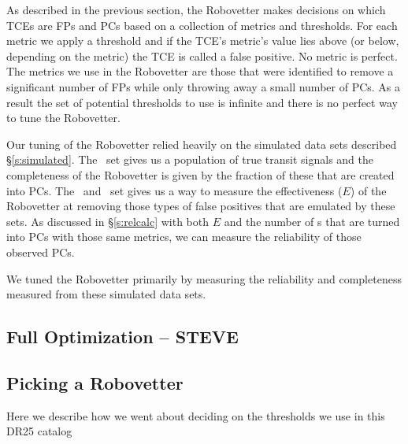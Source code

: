 
As described in the previous section, the Robovetter makes decisions on which TCEs are FPs and PCs based on a collection of metrics and thresholds.  For each metric we apply a threshold and if the TCE's metric's value lies above (or below, depending on the metric) the TCE is called a false positive.  No metric is perfect.  The metrics we use in the Robovetter are those that were identified to remove a significant number of FPs while only throwing away a small number of PCs.  As a result the set of potential thresholds to use is infinite and there is no perfect way to tune the Robovetter.

Our tuning of the Robovetter relied heavily on the simulated data sets described \S\ref{s:simulated}. The \injtce\ set gives us a population of true transit signals and the completeness of the Robovetter is given by the fraction of these that are created into PCs.  The \scrtce\ and \invtce\ set gives us a way to measure the effectiveness ($E$) of the Robovetter at removing those types of false positives that are emulated by these sets. As discussed in \S\ref{s:relcalc} with both $E$ and the number of \opstce s that are turned into PCs with those same metrics, we can measure the reliability of those observed PCs.  

We tuned the Robovetter primarily by measuring the reliability and completeness measured from these simulated data sets. 

\subsection{Full Optimization -- STEVE}

\subsection{Picking a Robovetter}
Here we describe how we went about deciding on the thresholds we use in this DR25 catalog
